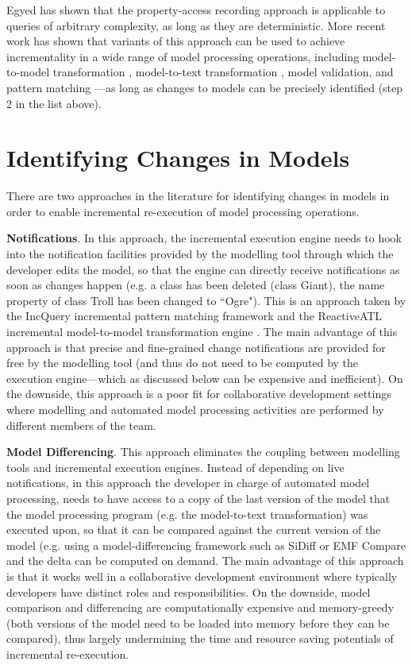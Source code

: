 Egyed has shown that the property-access recording approach is applicable to queries of arbitrary complexity, 
as long as they are deterministic. More recent work has shown that variants of this approach can be used to 
achieve incrementality in a wide range of model processing operations, including model-to-model 
transformation \cite{jouault2010towards}, model-to-text transformation \cite{DBLP:conf/ecmdafa/OgunyomiRK15}, 
model validation, and pattern matching \cite{DBLP:conf/ecmdafa/RathHV12}---as long as changes to models can be 
precisely identified (step 2 in the list above).

\section{Identifying Changes in Models}
\label{sec:identifying_changes_in models}
There are two approaches in the literature for identifying changes in models in order to enable incremental re-execution of model processing operations.

\textbf{Notifications}. In this approach, the incremental execution engine needs to hook into the notification facilities provided by the modelling tool through which the developer edits the model, so that the engine can directly receive notifications as soon as changes happen (e.g. a class has been deleted (class \textsf{Giant}), the name property of class \textsf{Troll} has been changed to ``Ogre"). This is an approach taken by the IncQuery incremental pattern matching framework \cite{DBLP:conf/ecmdafa/RathHV12} and the ReactiveATL incremental model-to-model transformation engine \cite{DBLP:conf/ecmdafa/OgunyomiRK15}. The main advantage of this approach is that precise and fine-grained change notifications are provided for free by the modelling tool (and thus do not need to be computed by the execution engine---which as discussed below can be expensive and inefficient). On the downside, this approach is a poor fit for collaborative development settings where modelling and automated model processing activities are performed by different members of the team.

\textbf{Model Differencing}. This approach eliminates the coupling between modelling tools and incremental execution engines. Instead of depending on live notifications, in this approach the developer in charge of automated model processing, needs to have access to a copy of the last version of the model that the model processing program (e.g. the model-to-text transformation) was executed upon, so that it can be compared against the current version of the model (e.g. using a model-differencing framework such as SiDiff \cite{Treude2007SiDiff} or EMF Compare \cite{eclipse2017compare} and the delta can be computed on demand. The main advantage of this approach is that it works well in a collaborative development environment where typically developers have distinct roles and responsibilities. On the downside, model comparison and differencing are computationally expensive and memory-greedy (both versions of the model need to be loaded into memory before they can be compared), thus largely undermining the time and resource saving potentials of incremental re-execution.

